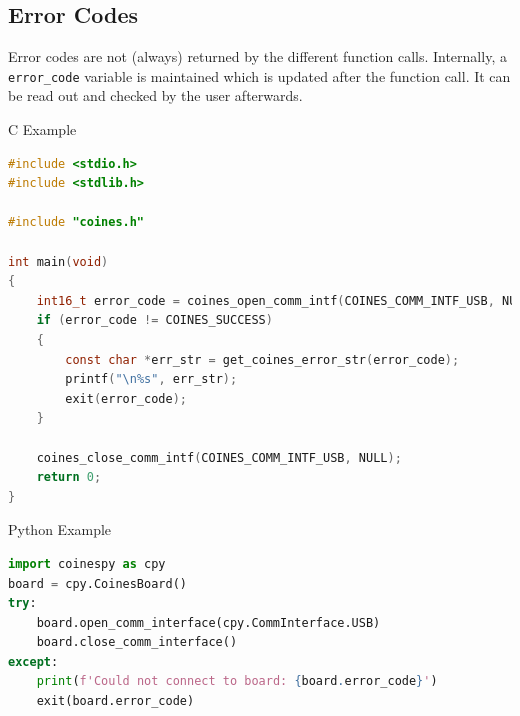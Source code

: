 \documentclass{article}
\begin{document}
\newpage


\newpage


\newpage
\subsection{Error Codes}

Error codes are not (always) returned by the different function calls. Internally, a \texttt{error\_code} variable is maintained which is updated after the function call. It can be read out and checked by the user afterwards.

C Example
\begin{lstlisting}[language=c]
#include <stdio.h>
#include <stdlib.h>

#include "coines.h"

int main(void)
{
    int16_t error_code = coines_open_comm_intf(COINES_COMM_INTF_USB, NULL);
    if (error_code != COINES_SUCCESS)
    {
        const char *err_str = get_coines_error_str(error_code);
        printf("\n%s", err_str);
        exit(error_code);
    }

    coines_close_comm_intf(COINES_COMM_INTF_USB, NULL);
    return 0;
}
\end{lstlisting}

Python Example
\begin{lstlisting}[language=python]
import coinespy as cpy
board = cpy.CoinesBoard()
try:
	board.open_comm_interface(cpy.CommInterface.USB)
	board.close_comm_interface()
except:
	print(f'Could not connect to board: {board.error_code}')
	exit(board.error_code)
\end{lstlisting}
\end{document}
